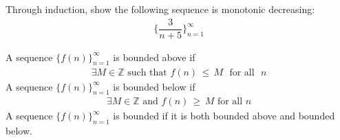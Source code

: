 \begin{exercise}
Through induction, show the following sequence is monotonic decreasing:
\begin{align*}
    \Big\{\dfrac{3}{n+5}\Big\}_{n=1}^{\infty}
\end{align*}
\end{exercise}

\begin{definition}
A sequence $\{f(n)\}_{n=1}^{\infty}$ is bounded above if
\begin{align*}
    \exists M \in \mathbb{Z} \hspace{4pt} \text{such that} \hspace{4pt} f(n) \hspace{2pt} \leq \hspace{2pt} M \hspace{4pt} \text{ for all } \hspace{4pt} n
\end{align*}
A sequence $\{f(n)\}_{n=1}^{\infty}$ is bounded below if
\begin{align*}
    \exists M \in \mathbb{Z} \hspace{4pt} \text{and} \hspace{4pt} f(n) \hspace{2pt} \geq \hspace{2pt} M \hspace{4pt} \text{for all} \hspace{4pt} n
\end{align*}
A sequence $\{f(n)\}_{n=1}^{\infty}$ is bounded if it is both bounded above and bounded below.
\end{definition}

